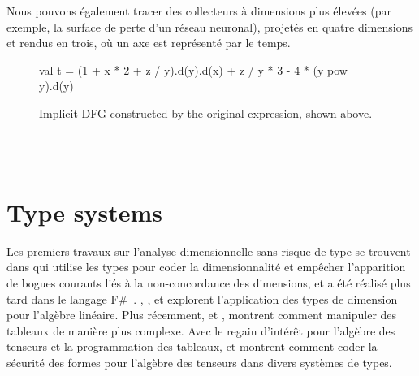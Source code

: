 Nous pouvons également tracer des collecteurs à dimensions plus élevées (par exemple, la surface de perte d'un réseau neuronal), projetés en quatre dimensions et rendus en trois, où un axe est représenté par le temps.
%
\begin{figure}
    \begin{unbreakablekotlin}
        val t = (1 + x * 2 + z / y).d(y).d(x) + z / y * 3 - 4 * (y pow y).d(y)
    \end{unbreakablekotlin}
\end{figure}
\vspace{-40pt}
\begin{figure}
    \centering
    
    \caption{Implicit DFG constructed by the original expression, shown above.}
    \label{lst:edsl}
\end{figure}\\\\

\section{Type systems}\label{sec:type-systems}

Les premiers travaux sur l'analyse dimensionnelle sans risque de type se trouvent dans \citet{kennedy1994dimension, kennedy1996programming} qui utilise les types pour coder la dimensionnalité et empêcher l'apparition de bogues courants liés à la non-concordance des dimensions, et a été réalisé plus tard dans le langage F\#~\citep{kennedy2010types}. \citet{jay1996shape}, \citet{rittri1995dimension}, et \citet{zenger1997indexed} explorent l'application des types de dimension pour l'algèbre linéaire. Plus récemment, \citet{kiselyov2005number, kiselyov2010fun} et \citet{griffioen2015type}, montrent comment manipuler des tableaux de manière plus complexe. Avec le regain d'intérêt pour l'algèbre des tenseurs et la programmation des tableaux, \citet{chen2017typesafe} et \citet{rink2018modeling} montrent comment coder la sécurité des formes pour l'algèbre des tenseurs dans divers systèmes de types.

